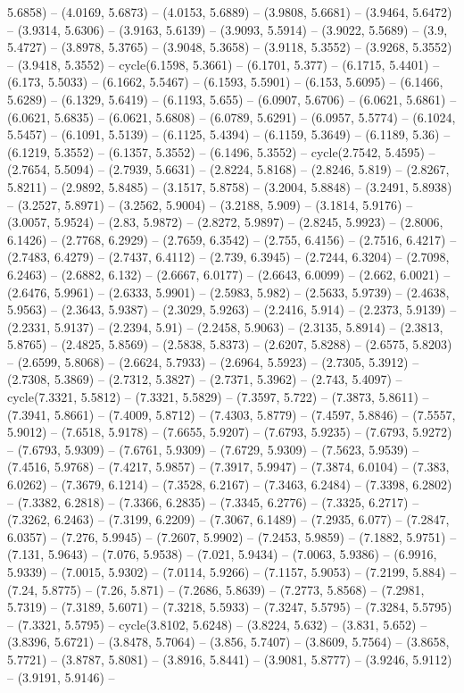 5.6858) -- (4.0169, 5.6873) -- (4.0153, 5.6889) -- (3.9808, 5.6681) -- (3.9464, 5.6472) -- (3.9314, 5.6306) -- (3.9163, 5.6139) -- (3.9093, 5.5914) -- (3.9022, 5.5689) -- (3.9, 5.4727) -- (3.8978, 5.3765) -- (3.9048, 5.3658) -- (3.9118, 5.3552) -- (3.9268, 5.3552) -- (3.9418, 5.3552) -- cycle(6.1598, 5.3661) -- (6.1701, 5.377) -- (6.1715, 5.4401) -- (6.173, 5.5033) -- (6.1662, 5.5467) -- (6.1593, 5.5901) -- (6.153, 5.6095) -- (6.1466, 5.6289) -- (6.1329, 5.6419) -- (6.1193, 5.655) -- (6.0907, 5.6706) -- (6.0621, 5.6861) -- (6.0621, 5.6835) -- (6.0621, 5.6808) -- (6.0789, 5.6291) -- (6.0957, 5.5774) -- (6.1024, 5.5457) -- (6.1091, 5.5139) -- (6.1125, 5.4394) -- (6.1159, 5.3649) -- (6.1189, 5.36) -- (6.1219, 5.3552) -- (6.1357, 5.3552) -- (6.1496, 5.3552) -- cycle(2.7542, 5.4595) -- (2.7654, 5.5094) -- (2.7939, 5.6631) -- (2.8224, 5.8168) -- (2.8246, 5.819) -- (2.8267, 5.8211) -- (2.9892, 5.8485) -- (3.1517, 5.8758) -- (3.2004, 5.8848) -- (3.2491, 5.8938) -- (3.2527, 5.8971) -- (3.2562, 5.9004) -- (3.2188, 5.909) -- (3.1814, 5.9176) -- (3.0057, 5.9524) -- (2.83, 5.9872) -- (2.8272, 5.9897) -- (2.8245, 5.9923) -- (2.8006, 6.1426) -- (2.7768, 6.2929) -- (2.7659, 6.3542) -- (2.755, 6.4156) -- (2.7516, 6.4217) -- (2.7483, 6.4279) -- (2.7437, 6.4112) -- (2.739, 6.3945) -- (2.7244, 6.3204) -- (2.7098, 6.2463) -- (2.6882, 6.132) -- (2.6667, 6.0177) -- (2.6643, 6.0099) -- (2.662, 6.0021) -- (2.6476, 5.9961) -- (2.6333, 5.9901) -- (2.5983, 5.982) -- (2.5633, 5.9739) -- (2.4638, 5.9563) -- (2.3643, 5.9387) -- (2.3029, 5.9263) -- (2.2416, 5.914) -- (2.2373, 5.9139) -- (2.2331, 5.9137) -- (2.2394, 5.91) -- (2.2458, 5.9063) -- (2.3135, 5.8914) -- (2.3813, 5.8765) -- (2.4825, 5.8569) -- (2.5838, 5.8373) -- (2.6207, 5.8288) -- (2.6575, 5.8203) -- (2.6599, 5.8068) -- (2.6624, 5.7933) -- (2.6964, 5.5923) -- (2.7305, 5.3912) -- (2.7308, 5.3869) -- (2.7312, 5.3827) -- (2.7371, 5.3962) -- (2.743, 5.4097) -- cycle(7.3321, 5.5812) -- (7.3321, 5.5829) -- (7.3597, 5.722) -- (7.3873, 5.8611) -- (7.3941, 5.8661) -- (7.4009, 5.8712) -- (7.4303, 5.8779) -- (7.4597, 5.8846) -- (7.5557, 5.9012) -- (7.6518, 5.9178) -- (7.6655, 5.9207) -- (7.6793, 5.9235) -- (7.6793, 5.9272) -- (7.6793, 5.9309) -- (7.6761, 5.9309) -- (7.6729, 5.9309) -- (7.5623, 5.9539) -- (7.4516, 5.9768) -- (7.4217, 5.9857) -- (7.3917, 5.9947) -- (7.3874, 6.0104) -- (7.383, 6.0262) -- (7.3679, 6.1214) -- (7.3528, 6.2167) -- (7.3463, 6.2484) -- (7.3398, 6.2802) -- (7.3382, 6.2818) -- (7.3366, 6.2835) -- (7.3345, 6.2776) -- (7.3325, 6.2717) -- (7.3262, 6.2463) -- (7.3199, 6.2209) -- (7.3067, 6.1489) -- (7.2935, 6.077) -- (7.2847, 6.0357) -- (7.276, 5.9945) -- (7.2607, 5.9902) -- (7.2453, 5.9859) -- (7.1882, 5.9751) -- (7.131, 5.9643) -- (7.076, 5.9538) -- (7.021, 5.9434) -- (7.0063, 5.9386) -- (6.9916, 5.9339) -- (7.0015, 5.9302) -- (7.0114, 5.9266) -- (7.1157, 5.9053) -- (7.2199, 5.884) -- (7.24, 5.8775) -- (7.26, 5.871) -- (7.2686, 5.8639) -- (7.2773, 5.8568) -- (7.2981, 5.7319) -- (7.3189, 5.6071) -- (7.3218, 5.5933) -- (7.3247, 5.5795) -- (7.3284, 5.5795) -- (7.3321, 5.5795) -- cycle(3.8102, 5.6248) -- (3.8224, 5.632) -- (3.831, 5.652) -- (3.8396, 5.6721) -- (3.8478, 5.7064) -- (3.856, 5.7407) -- (3.8609, 5.7564) -- (3.8658, 5.7721) -- (3.8787, 5.8081) -- (3.8916, 5.8441) -- (3.9081, 5.8777) -- (3.9246, 5.9112) -- (3.9191, 5.9146) -- 